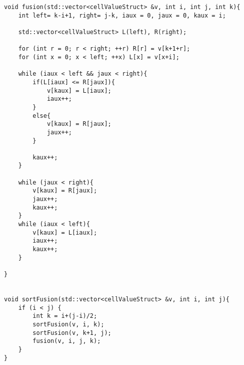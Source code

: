 \begin{lstlisting}
void fusion(std::vector<cellValueStruct> &v, int i, int j, int k){
    int left= k-i+1, right= j-k, iaux = 0, jaux = 0, kaux = i;

    std::vector<cellValueStruct> L(left), R(right);

    for (int r = 0; r < right; ++r) R[r] = v[k+1+r];
    for (int x = 0; x < left; ++x) L[x] = v[x+i];

    while (iaux < left && jaux < right){
        if(L[iaux] <= R[jaux]){
            v[kaux] = L[iaux];
            iaux++;
        }
        else{
            v[kaux] = R[jaux];
            jaux++;
        }

        kaux++;
    }

    while (jaux < right){
        v[kaux] = R[jaux];
        jaux++;
        kaux++;
    }
    while (iaux < left){
        v[kaux] = L[iaux];
        iaux++;
        kaux++;
    }

}


void sortFusion(std::vector<cellValueStruct> &v, int i, int j){ 
    if (i < j) { 
        int k = i+(j-i)/2; 
        sortFusion(v, i, k); 
        sortFusion(v, k+1, j); 
        fusion(v, i, j, k); 
    } 
} 

\end{lstlisting}